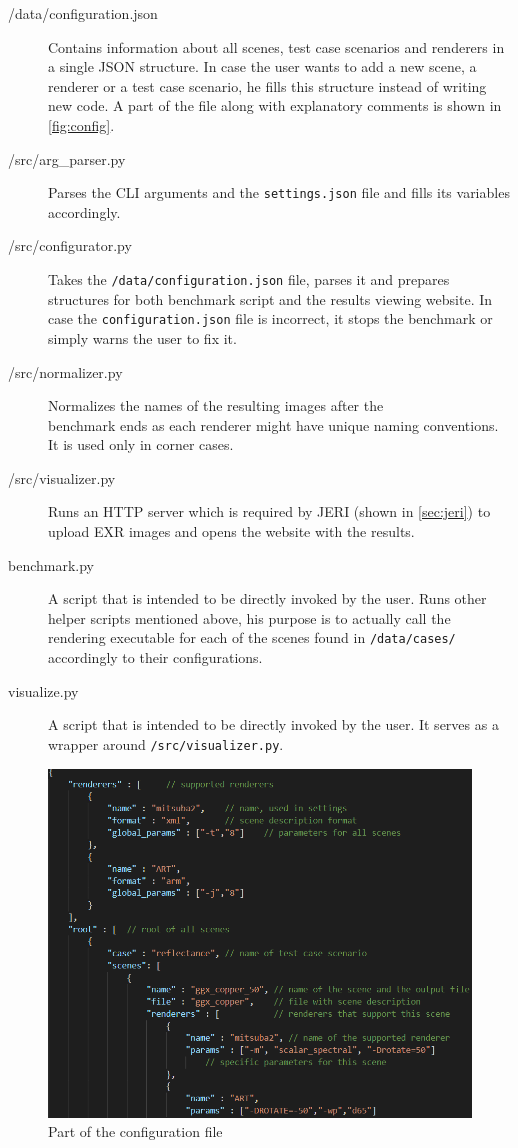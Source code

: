 \begin{description}
	\item[{/data/configuration.json}] Contains information about all scenes, test case scenarios and renderers in a single JSON structure. In case the user wants to add a new scene, a renderer or a test case scenario, he fills this structure instead of writing new code. A part of the file along with explanatory comments is shown in \autoref{fig:config}.
	\item[/src/arg\_parser.py] Parses the CLI arguments and the \texttt{settings.json} file and fills its variables accordingly.
	\item[/src/configurator.py] Takes the \texttt{/data/configuration.json} file, parses it and prepares structures for both benchmark script and the results viewing website. In case the \texttt{configuration.json} file is incorrect, it stops the benchmark or simply warns the user to fix it.
	\item[/src/normalizer.py] Normalizes the names of the resulting images after the \\benchmark ends as each renderer might have unique naming conventions. It is used only in corner cases.
	\item[/src/visualizer.py] Runs an HTTP server which is required by JERI (shown in \autoref{sec:jeri}) to upload EXR images and opens the website with the results.
	\item[benchmark.py] A script that is intended to be directly invoked by the user. Runs other helper scripts mentioned above, his purpose is to actually call the rendering executable for each of the scenes found in \texttt{/data/cases/} accordingly to their configurations.
	\item[visualize.py] A script that is intended to be directly invoked by the user. It serves as a wrapper around \texttt{/src/visualizer.py}.
\end{description}

\begin{figure}
	\centering
	\includegraphics[width=\linewidth]{img/config.png}
	\caption{Part of the configuration file}
	\label{fig:config}
\end{figure}

